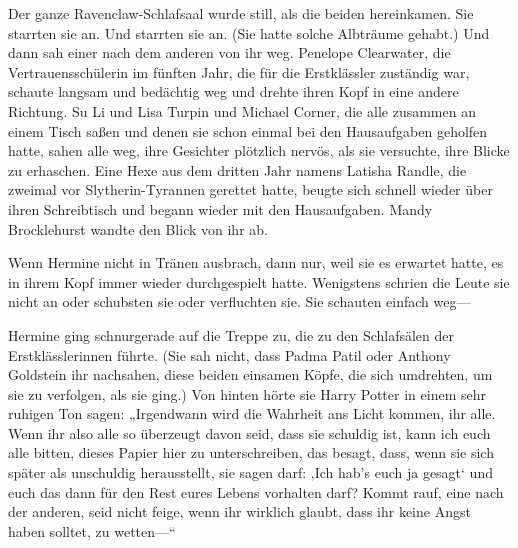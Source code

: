 Der ganze Ravenclaw-Schlafsaal wurde still, als die beiden hereinkamen. Sie starrten sie an. Und starrten sie an. (Sie hatte solche Albträume gehabt.) Und dann sah einer nach dem anderen von ihr weg. Penelope Clearwater, die Vertrauensschülerin im fünften Jahr, die für die Erstklässler zuständig war, schaute langsam und bedächtig weg und drehte ihren Kopf in eine andere Richtung. Su Li und Lisa Turpin und Michael Corner, die alle zusammen an einem Tisch saßen und denen sie schon einmal bei den Hausaufgaben geholfen hatte, sahen alle weg, ihre Gesichter plötzlich nervös, als sie versuchte, ihre Blicke zu erhaschen. Eine Hexe aus dem dritten Jahr namens Latisha Randle, die \SPHEW zweimal vor Slytherin-Tyrannen gerettet hatte, beugte sich schnell wieder über ihren Schreibtisch und begann wieder mit den Hausaufgaben. Mandy Brocklehurst wandte den Blick von ihr ab.

Wenn Hermine nicht in Tränen ausbrach, dann nur, weil sie es erwartet hatte, es in ihrem Kopf immer wieder durchgespielt hatte. Wenigstens schrien die Leute sie nicht an oder schubsten sie oder verfluchten sie. Sie schauten einfach weg—

Hermine ging schnurgerade auf die Treppe zu, die zu den Schlafsälen der Erstklässlerinnen führte. (Sie sah nicht, dass Padma Patil oder Anthony Goldstein ihr nachsahen, diese beiden einsamen Köpfe, die sich umdrehten, um sie zu verfolgen, als sie ging.) Von hinten hörte sie Harry Potter in einem sehr ruhigen Ton sagen: „Irgendwann wird die Wahrheit ans Licht kommen, ihr alle. Wenn ihr also alle so überzeugt davon seid, dass sie schuldig ist, kann ich euch alle bitten, dieses Papier hier zu unterschreiben, das besagt, dass, wenn sie sich später als unschuldig herausstellt, sie sagen darf: ‚Ich hab’s euch ja gesagt‘ und euch das dann für den Rest eures Lebens vorhalten darf? Kommt rauf, eine nach der anderen, seid nicht feige, wenn ihr wirklich glaubt, dass ihr keine Angst haben solltet, zu wetten—“

